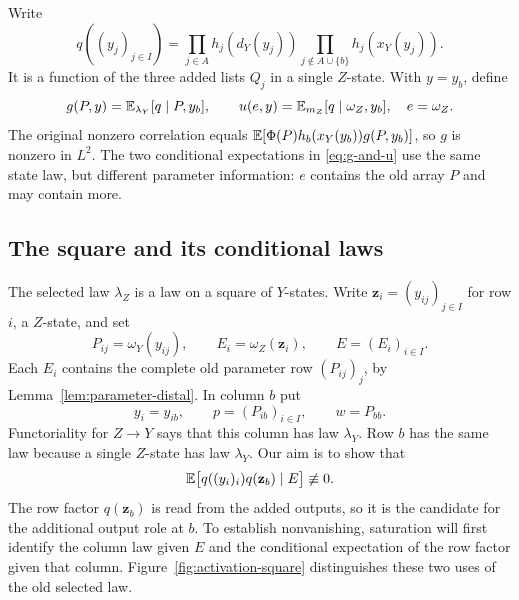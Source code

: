 Write
\begin{equation}\label{eq:outside-product}
 q((y_j)_{j\in I})=
 \prod_{j\in A}h_j(d_Y(y_j))
 \prod_{j\notin A\cup\{b\}}h_j(x_Y(y_j)).
\end{equation}
It is a function of the three added lists $Q_j$ in a single $Z$-state.
With $y=y_b$, define
\begin{equation}\label{eq:g-and-u}
 g(P,y)=\mathbb E_{\lambda_Y}[q\mid P,y_b],\qquad
 u(e,y)=\mathbb E_{m_Z}[q\mid\omega_Z,y_b],\quad e=\omega_Z.
\end{equation}
The original nonzero correlation equals
$\mathbb E[\Phi(P)h_b(x_Y(y_b))g(P,y_b)]$, so $g$ is nonzero in $L^2$.
The two conditional expectations in \eqref{eq:g-and-u} use the same
state law, but different parameter information: $e$ contains the old
array $P$ and may contain more.

\subsection{The square and its conditional laws}

The selected law $\lambda_Z$ is a law on a square of $Y$-states.
Write $\mathbf z_i=(y_{ij})_{j\in I}$ for row $i$, a $Z$-state, and set
\[
 P_{ij}=\omega_Y(y_{ij}),\qquad
 E_i=\omega_Z(\mathbf z_i),\qquad E=(E_i)_{i\in I}.
\]
Each $E_i$ contains the complete old parameter row $(P_{ij})_j$, by
Lemma~\ref{lem:parameter-distal}. In column $b$ put
\[
 y_i=y_{ib},\qquad p=(P_{ib})_{i\in I},\qquad w=P_{bb}.
\]
Functoriality for $Z\to Y$ says that this column has law $\lambda_Y$.
Row $b$ has the same law because a single $Z$-state has law $\lambda_Y$.
Our aim is to show that
\[
 \mathbb E\bigl[q((y_i)_i)q(\mathbf z_b)\mid E\bigr]\not\equiv0.
\]
The row factor $q(\mathbf z_b)$ is read from the added outputs, so it
is the candidate for the additional output role at $b$. To establish
nonvanishing, saturation will first identify the column law given $E$
and the conditional expectation of the row factor given that column.
Figure~\ref{fig:activation-square} distinguishes these two uses of the
old selected law.

